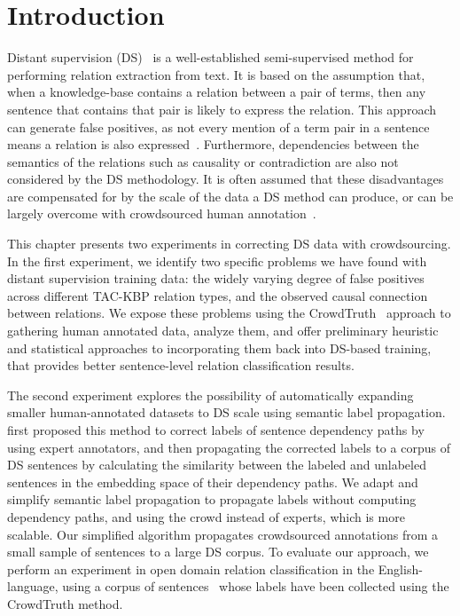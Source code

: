 \section{Introduction}

Distant supervision (DS)~\cite{mintz2009distant,Welty:2010:LSR} is a well-established semi-supervised method for performing relation extraction from text. It is based on the assumption that, when a knowledge-base contains a relation between a pair of terms, then any sentence that contains that pair is likely to express the relation. This approach can generate false positives, as not every mention of a term pair in a sentence means a relation is also expressed~\cite{DBLP:conf/ijcai/FengGQLL17}. Furthermore, dependencies between the semantics of the relations such as causality or contradiction are also not considered by the DS methodology. It is often assumed that these disadvantages are compensated for by the scale of the data a DS method can produce, or can be largely overcome with crowdsourced human annotation~\cite{angeli2014combining,liu2016effective}.  

This chapter presents two experiments in correcting DS data with crowdsourcing. In the first experiment, we identify two specific problems we have found with distant supervision training data: the widely varying degree of false positives across different TAC-KBP relation types, and the observed causal connection between relations. We expose these problems using the CrowdTruth~\cite{aroyo2014threesides,aroyo2015truth,aroyo2013crowd} approach to gathering human annotated data, analyze them, and offer preliminary heuristic and statistical approaches to incorporating them back into DS-based training, that provides better sentence-level relation classification results. %

The second experiment explores the possibility of automatically expanding smaller human-annotated datasets to DS scale using semantic label propagation. \citet{sterckx2016knowledge} first proposed this method to correct labels of sentence dependency paths by using expert annotators, and then propagating the corrected labels to a corpus of DS sentences by calculating the similarity between the labeled and unlabeled sentences in the embedding space of their dependency paths. We adapt and simplify semantic label propagation to propagate labels without computing dependency paths, and using the crowd instead of experts, which is more scalable. Our simplified algorithm propagates crowdsourced annotations from a small sample of sentences to a large DS corpus. To evaluate our approach, we perform an experiment in open domain relation classification in the English-language, using a corpus of sentences~\cite{crowdODrelexdata2016} whose labels have been collected using the CrowdTruth method.


